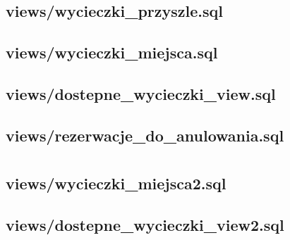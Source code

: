 \documentclass[12pt]{article}
\begin{document}
\subsection{views/wycieczki\_przyszle.sql}


\subsection{views/wycieczki\_miejsca.sql}


\subsection{views/dostepne\_wycieczki\_view.sql}


\subsection{views/rezerwacje\_do\_anulowania.sql}


\section{}

\subsection{views/wycieczki\_miejsca2.sql}


\subsection{views/dostepne\_wycieczki\_view2.sql}

\end{document}
